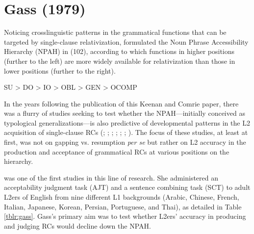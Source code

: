 \section{Gass (1979)}\label{acq-gass}

Noticing crosslinguistic patterns in the grammatical functions that can be targeted by single-clause relativization, \textcite{keenan.comrie1977} formulated the Noun Phrase Accessibility Hierarchy (NPAH) in (102), according to which functions in higher positions (further to the left) are more widely available for relativization than those in lower positions (further to the right).

\pex 
SU > DO > IO > OBL > GEN > OCOMP\footnotemark
\xe 


In the years following the publication of this Keenan and Comrie paper, there was a flurry of studies seeking to test whether the NPAH---initially conceived as typological generalizations---is also predictive of developmental patterns in the L2 acquisition of single-clause RCs (\cite{eckman.etal1988}; \cite{gass1979}; \cite{hawkins.chan1997}; \cite{ioup.kruse1977}; \cite{schachter.etal1976}; \cite{tarallo.myhill1983}; \cite{yip.matthews1991}). The focus of these studies, at least at first, was not on gapping vs. resumption \textit{per se} but rather on L2 accuracy in the production and acceptance of grammatical RCs at various positions on the hierarchy. 

\textcite{gass1979} was one of the first studies in this line of research. She administered an acceptability judgment task (AJT) and a sentence combining task (SCT) to adult L2ers of English from nine different L1 backgrounds (Arabic, Chinese, French, Italian, Japanese, Korean, Persian, Portuguese, and Thai), as detailed in Table \ref{tblr:gass}. Gass's primary aim was to test whether L2ers' accuracy in producing and judging RCs would decline down the NPAH.

